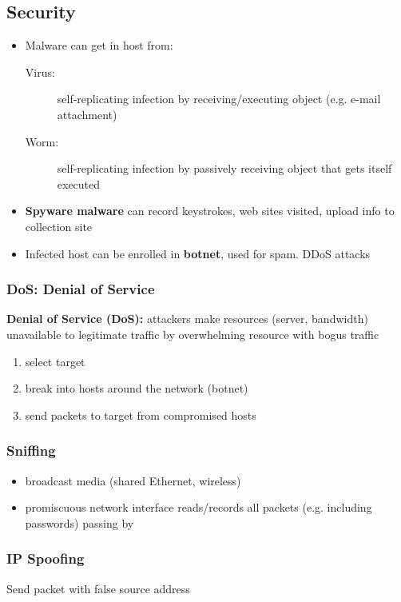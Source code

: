 \subsection{Security}
\begin{itemize}
	\item Malware can get in host from:
	\begin{description}
		\item[Virus:] self-replicating infection by receiving/executing object (e.g. e-mail attachment)
		\item[Worm:] self-replicating infection by passively receiving object that gets itself executed
	\end{description}
	\item \textbf{Spyware malware} can record keystrokes, web sites visited, upload info to collection site
	\item Infected host can be enrolled in \textbf{botnet}, used for spam. DDoS attacks
\end{itemize}
\subsubsection{DoS: Denial of Service}
\textbf{Denial of Service (DoS):} attackers make resources (server, bandwidth) unavailable to legitimate traffic by overwhelming resource with bogus traffic
\begin{enumerate}
	\item select target
	\item break into hosts around the network (botnet)
	\item send packets to target from compromised hosts
\end{enumerate}
\subsubsection{Sniffing}
\begin{itemize}
	\item broadcast media (shared Ethernet, wireless)
	\item promiscuous network interface reads/records all packets (e.g. including passwords) passing by
\end{itemize}
\subsubsection{IP Spoofing}
Send packet with false source address